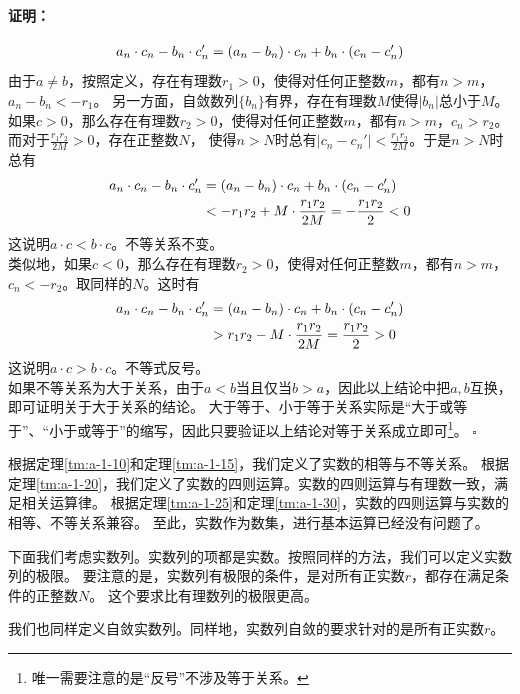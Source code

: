 \documentclass[12pt,UTF8]{ctexbook}
\newenvironment{proof2}{\paragraph{\textbf{证明：}}}{\hfill$\square$}
\begin{document}
\begin{appendix}
\begin{proof2}
    \begin{align}
        a_n\cdot c_n - b_n\cdot c_n' &= (a_n - b_n)\cdot c_n + b_n\cdot(c_n - c_n') \notag \\
    \end{align}
    由于$a\neq b$，按照定义，存在有理数$r_1>0$，使得对任何正整数$m$，都有$n>m$，$a_n - b_n < -r_1$。
    另一方面，自敛数列$\{b_n\}$有界，存在有理数$M$使得$|b_n|$总小于$M$。\\
    如果$c > 0$，那么存在有理数$r_2>0$，使得对任何正整数$m$，都有$n>m$，$c_n > r_2$。
    而对于$\frac{r_1r_2}{2M}>0$，存在正整数$N$，
    使得$n>N$时总有$|c_n - c_n'| < \frac{r_1r_2}{2M}$。于是$n>N$时总有
    \begin{align}
        a_n\cdot c_n - b_n\cdot c_n' &= (a_n - b_n)\cdot c_n + b_n\cdot(c_n - c_n') \notag \\
        &< -r_1r_2 + M\cdot\frac{r_1r_2}{2M} = -\frac{r_1r_2}{2} < 0 \notag
    \end{align}
    这说明$a\cdot c < b\cdot c$。不等关系不变。\\
    类似地，如果$c < 0$，那么存在有理数$r_2>0$，使得对任何正整数$m$，都有$n>m$，$c_n < -r_2$。取同样的$N$。这时有
    \begin{align}
        a_n\cdot c_n - b_n\cdot c_n' &= (a_n - b_n)\cdot c_n + b_n\cdot(c_n - c_n') \notag \\
        &> r_1r_2 - M\cdot\frac{r_1r_2}{2M} = \frac{r_1r_2}{2} > 0 \notag
    \end{align}
    这说明$a\cdot c > b\cdot c$。不等式反号。\\
    如果不等关系为大于关系，由于$a<b$当且仅当$b>a$，因此以上结论中把$a,b$互换，即可证明关于大于关系的结论。
    大于等于、小于等于关系实际是“大于或等于”、“小于或等于”的缩写，因此只要验证以上结论对等于关系成立即可\footnote{唯一需要注意的是“反号”不涉及等于关系。}。
\end{proof2}

根据定理\ref{tm:a-1-10}和定理\ref{tm:a-1-15}，我们定义了实数的相等与不等关系。
根据定理\ref{tm:a-1-20}，我们定义了实数的四则运算。实数的四则运算与有理数一致，满足相关运算律。
根据定理\ref{tm:a-1-25}和定理\ref{tm:a-1-30}，实数的四则运算与实数的相等、不等关系兼容。
至此，实数作为数集，进行基本运算已经没有问题了。

下面我们考虑实数列。实数列的项都是实数。按照同样的方法，我们可以定义实数列的极限。
要注意的是，实数列有极限的条件，是对所有正实数$r$，都存在满足条件的正整数$N$。
这个要求比有理数列的极限更高。

我们也同样定义自敛实数列。同样地，实数列自敛的要求针对的是所有正实数$r$。


\end{appendix}
\end{document}
